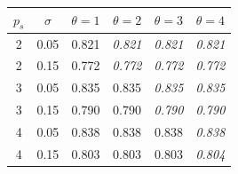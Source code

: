 \begin{tabular}{cccccc}
\toprule
$p_s$ & $\sigma$ & $\theta=1$ & $\theta=2$ & $\theta=3$ & $\theta=4$ \\
\midrule
2 & 0.05 & 0.821 & \textit{0.821} & \textit{0.821} & \textit{0.821} \\
2 & 0.15 & 0.772 & \textit{0.772} & \textit{0.772} & \textit{0.772} \\
3 & 0.05 & 0.835 & 0.835 & \textit{0.835} & \textit{0.835} \\
3 & 0.15 & 0.790 & 0.790 & \textit{0.790} & \textit{0.790} \\
4 & 0.05 & 0.838 & 0.838 & 0.838 & \textit{0.838} \\
4 & 0.15 & 0.803 & 0.803 & 0.803 & \textit{0.804} \\
\bottomrule
\end{tabular}
